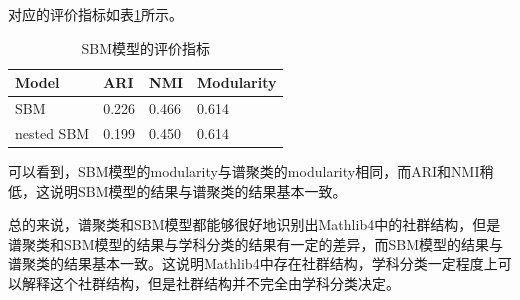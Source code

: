 对应的评价指标如表\ref{tab:score2}所示。
\begin{table}[h!]
  \centering
  \caption{SBM模型的评价指标}
  \begin{tabular}{llll}
    \toprule
    Model & ARI & NMI & Modularity\\
    \midrule
    SBM & 0.226 & 0.466 & 0.614\\
    nested SBM & 0.199 & 0.450 & 0.614\\
    \bottomrule
  \end{tabular}
  \label{tab:score2}
\end{table}

可以看到，SBM模型的modularity与谱聚类的modularity相同，而ARI和NMI稍低，这说明SBM模型的结果与谱聚类的结果基本一致。

总的来说，谱聚类和SBM模型都能够很好地识别出Mathlib4中的社群结构，但是谱聚类和SBM模型的结果与学科分类的结果有一定的差异，而SBM模型的结果与谱聚类的结果基本一致。这说明Mathlib4中存在社群结构，学科分类一定程度上可以解释这个社群结构，但是社群结构并不完全由学科分类决定。





